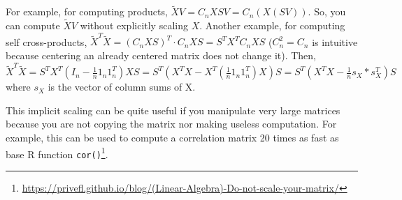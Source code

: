 For example, for computing products, $\tilde{X} V = C_n X S V = C_n (X (S V))$. So, you can compute $\tilde{X} V$ without explicitly scaling $X$. 
Another example, for computing self cross-products, $\tilde{X}^T \tilde{X} = (C_n X S)^T \cdot C_n X S = S^T X^T C_n X S$ ($C_n^2 = C_n$ is intuitive because centering an already centered matrix does not change it). Then, $\tilde{X}^T \tilde{X} = S^T X^T (I_n - \frac{1}{n} 1_n 1_n^T) X S = S^T (X^T X - X^T (\frac{1}{n} 1_n 1_n^T) X) S = S^T (X^T X - \frac{1}{n} s_X * s_X^T) S$ where $s_X$ is the vector of column sums of X.

This implicit scaling can be quite useful if you manipulate very large matrices because you are not copying the matrix nor making useless computation. 
For example, this can be used to compute a correlation matrix 20 times as fast as base R function \texttt{cor()}\footnote{\url{https://privefl.github.io/blog/(Linear-Algebra)-Do-not-scale-your-matrix/}}.
